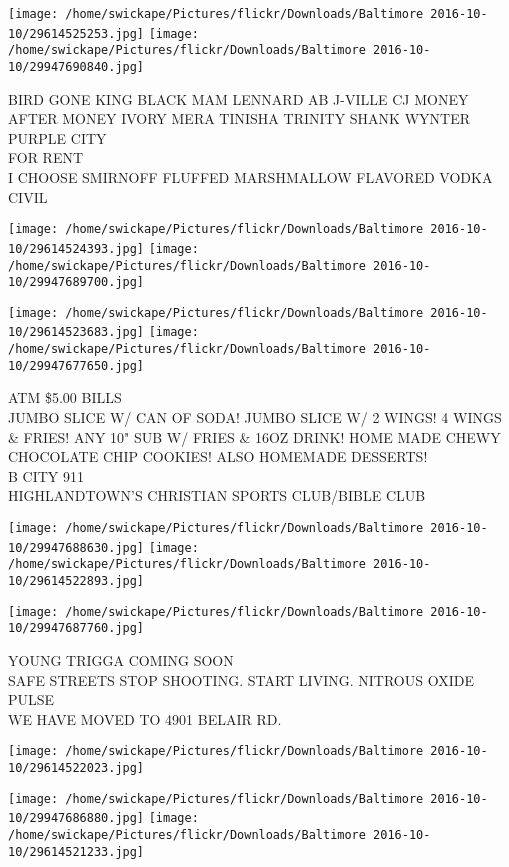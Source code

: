 \documentclass[10pt,letterpaper]{article}
\begin{document}
\texttt{[image: /home/swickape/Pictures/flickr/Downloads/Baltimore 2016-10-10/29614525253.jpg]}
\texttt{[image: /home/swickape/Pictures/flickr/Downloads/Baltimore 2016-10-10/29947690840.jpg]}

BIRD GONE KING BLACK MAM LENNARD AB J{-}VILLE CJ MONEY AFTER MONEY IVORY MERA TINISHA TRINITY SHANK WYNTER PURPLE CITY\\
FOR RENT\\
I CHOOSE SMIRNOFF FLUFFED MARSHMALLOW FLAVORED VODKA\\
CIVIL
\pagebreak

\texttt{[image: /home/swickape/Pictures/flickr/Downloads/Baltimore 2016-10-10/29614524393.jpg]}
\texttt{[image: /home/swickape/Pictures/flickr/Downloads/Baltimore 2016-10-10/29947689700.jpg]}

\texttt{[image: /home/swickape/Pictures/flickr/Downloads/Baltimore 2016-10-10/29614523683.jpg]}
\texttt{[image: /home/swickape/Pictures/flickr/Downloads/Baltimore 2016-10-10/29947677650.jpg]}

ATM \$5.00 BILLS\\
JUMBO SLICE W/ CAN OF SODA! JUMBO SLICE W/ 2 WINGS!    4 WINGS \& FRIES!  ANY 10" SUB W/ FRIES \& 16OZ DRINK!  HOME MADE CHEWY CHOCOLATE CHIP COOKIES!  ALSO HOMEMADE DESSERTS!\\
B CITY 911\\
HIGHLANDTOWN'S CHRISTIAN SPORTS CLUB/BIBLE CLUB
\pagebreak

\texttt{[image: /home/swickape/Pictures/flickr/Downloads/Baltimore 2016-10-10/29947688630.jpg]}
\texttt{[image: /home/swickape/Pictures/flickr/Downloads/Baltimore 2016-10-10/29614522893.jpg]}

\texttt{[image: /home/swickape/Pictures/flickr/Downloads/Baltimore 2016-10-10/29947687760.jpg]}

YOUNG TRIGGA COMING SOON\\
SAFE STREETS STOP SHOOTING. START LIVING.  NITROUS OXIDE PULSE\\
WE HAVE MOVED TO 4901 BELAIR RD.
\pagebreak

\texttt{[image: /home/swickape/Pictures/flickr/Downloads/Baltimore 2016-10-10/29614522023.jpg]}

\vspace{0.25in}
\texttt{[image: /home/swickape/Pictures/flickr/Downloads/Baltimore 2016-10-10/29947686880.jpg]}
\texttt{[image: /home/swickape/Pictures/flickr/Downloads/Baltimore 2016-10-10/29614521233.jpg]}
\end{document}
